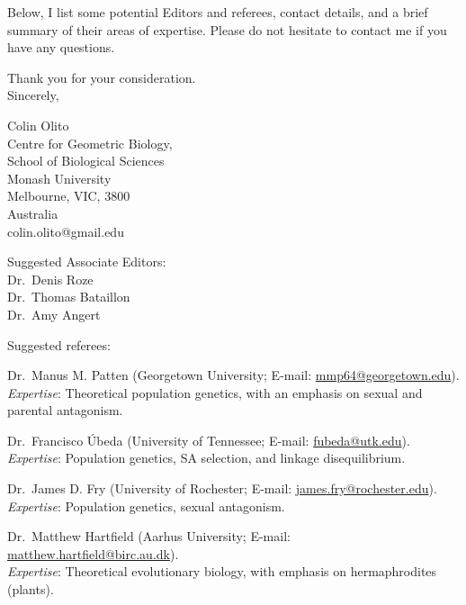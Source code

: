 \documentclass[11pt]{article}
\begin{document}
Below, I list some potential Editors and referees, contact details, and a brief summary of their areas of expertise. Please do not hesitate to contact me if you have any questions.
\bigskip

\noindent Thank you for your consideration. \\
\noindent Sincerely,
\bigskip

\noindent Colin Olito \\
\noindent Centre for Geometric Biology, \\
\noindent School of Biological Sciences \\
\noindent Monash University \\
\noindent Melbourne, VIC, 3800 \\
\noindent Australia \\
\noindent colin.olito@gmail.edu \\

\bigskip
\hline
\bigskip

\noindent Suggested Associate Editors: \\
\noindent Dr.~Denis Roze \\
\noindent Dr.~Thomas Bataillon \\
\noindent Dr.~Amy Angert \\
\bigskip

\noindent{} Suggested referees:
\bigskip

\noindent{} Dr.~Manus M. Patten (Georgetown University; E-mail: \url{mmp64@georgetown.edu}). \\
\noindent{} \textit{Expertise}: Theoretical population genetics, with an emphasis on sexual and parental antagonism.
\bigskip

\noindent{} Dr.~Francisco \'{U}beda (University of Tennessee; E-mail: \url{fubeda@utk.edu}). \\
\noindent{} \textit{Expertise}: Population genetics, SA selection, and linkage disequilibrium. 
\bigskip

\noindent{} Dr.~James D. Fry (University of Rochester; E-mail: \url{james.fry@rochester.edu}). \\
\noindent{} \textit{Expertise}: Population genetics, sexual antagonism.
\bigskip

\noindent{} Dr.~Matthew Hartfield (Aarhus University; E-mail: \url{matthew.hartfield@birc.au.dk}). \\
\noindent{} \textit{Expertise}: Theoretical evolutionary biology, with emphasis on hermaphrodites (plants).
\bigskip
\end{document}

